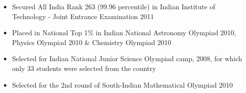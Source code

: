 %
%
%


{
\begin{itemize}
	\item Secured All India Rank 263 (99.96 percentile) in Indian Institute of Technology - Joint Entrance Examination 2011
	\item Placed in National Top 1\% in Indian National Astronomy Olympiad 2010, Physics Olympiad 2010 \& Chemistry Olympiad 2010
    \item Selected for Indian National Junior Science Olympiad camp, 2008, for which only 33 students were selected from the country
    \item Selected for the 2nd round of South-Indian Mathematical Olympiad 2010
\end{itemize}
}


